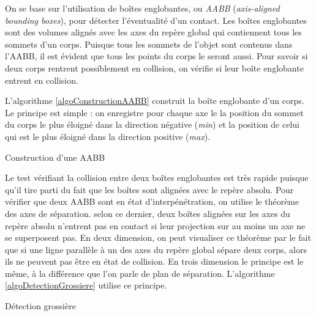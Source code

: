 On se base sur l'utilisation de boîtes englobantes, ou \textit{AABB}
(\textit{axis-aligned bounding boxes}), pour détecter l'éventualité
d'un contact. Les boîtes englobantes sont des volumes alignés avec les
axes du repère global qui contiennent tous les sommets d'un
corps. Puisque tous les sommets de l'objet sont contenus dans l'AABB,
il est évident que tous les points du corps le seront aussi. Pour
savoir si deux corps rentrent possiblement en collision, on vérifie si
leur boîte englobante entrent en collision.

L'algorithme \ref{algoConstructionAABB} construit la boîte englobante d'un
corps. Le principe est simple : on enregistre pour chaque axe le la
position du sommet du corps le plus éloigné dans la direction négative
(\textit{min}) et la position de celui qui est le plus éloigné dans la
direction positive (\textit{max}).

\begin{algorithm}[h]
  \caption{Construction d'une AABB}
  \label{algoConstructionAABB}
  \dontprintsemicolon
  \BlankLine
  \BlankLine
\end{algorithm}

Le test vérifiant la collision entre deux boîtes englobantes est très
rapide puisque qu'il tire parti du fait que les boîtes sont alignées
avec le repère absolu. Pour vérifier que deux AABB sont en état
d'interpénétration, on utilise le théorème des axes de séparation.
selon ce dernier, deux boîtes alignées sur les axes du repère absolu
n'entrent pas en contact si leur projection sur au moins un axe ne se
superposent pas. En deux dimension, on peut visualiser ce théorème par
le fait que si une ligne parallèle à un des axes du repère global
sépare deux corps, alors ils ne peuvent pas être en état de
collision. En trois dimension le principe est le même, à la différence
que l'on parle de plan de séparation. L'algorithme
\ref{algoDetectionGrossiere} utilise ce principe.

\begin{algorithm}[h]
  \caption{Détection grossière}
  \label{algoDetectionGrossiere}
  \dontprintsemicolon
  \BlankLine
\end{algorithm}

